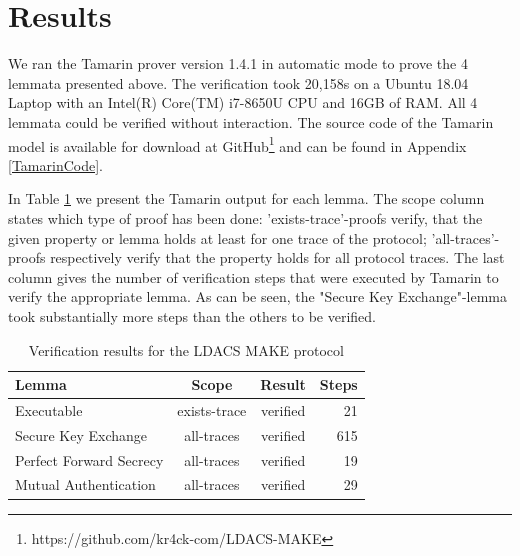 \section{Results}
\label{Results}

We ran the Tamarin prover version 1.4.1 in automatic mode to prove the 4 lemmata presented above. The verification took 20,158s on a Ubuntu 18.04 Laptop with an Intel(R) Core(TM) i7-8650U CPU and 16GB of RAM. All 4 lemmata could be verified without interaction. The source code of the Tamarin model is available for download at GitHub\footnote{https://github.com/kr4ck-com/LDACS-MAKE} and can be found in Appendix \ref{TamarinCode}.

In Table \ref{tab:tamarin_results} we present the Tamarin output for each lemma. The scope column states which type of proof has been done: 'exists-trace'-proofs verify, that the given property or lemma holds at least for one trace of the protocol; 'all-traces'-proofs respectively verify that the property holds for all protocol traces. The last column gives the number of verification steps that were executed by Tamarin to verify the appropriate lemma. As can be seen, the "Secure Key Exchange"-lemma took substantially more steps than the others to be verified.

\begin{table}
	\centering
    \caption{Verification results for the LDACS MAKE protocol}
    \begin{tabular}{|l|c|c|r|}
    \hline
        Lemma & Scope & Result & Steps \\
        \hline
        Executable & exists-trace & verified & 21 \\
        Secure Key Exchange & all-traces & verified & 615 \\
        Perfect Forward Secrecy & all-traces & verified & 19 \\
        Mutual Authentication & all-traces & verified & 29 \\
        
        \hline
    \end{tabular}
    
    \label{tab:tamarin_results}
\end{table}
 
